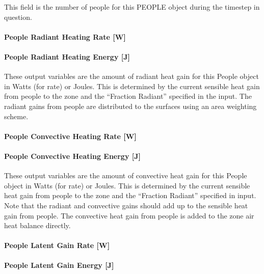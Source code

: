 This field is the number of people for this PEOPLE object during the timestep in question.

\paragraph{People Radiant Heating Rate {[}W{]}}\label{people-radiant-heating-rate-w}

\paragraph{People Radiant Heating Energy {[}J{]}}\label{people-radiant-heating-energy-j}

These output variables are the amount of radiant heat gain for this People object in Watts (for rate) or Joules. This is determined by the current sensible heat gain from people to the zone and the ``Fraction Radiant'' specified in the input. The radiant gains from people are distributed to the surfaces using an area weighting scheme.

\paragraph{People Convective Heating Rate {[}W{]}}\label{people-convective-heating-rate-w}

\paragraph{People Convective Heating Energy {[}J{]}}\label{people-convective-heating-energy-j}

These output variables are the amount of convective heat gain for this People object in Watts (for rate) or Joules. This is determined by the current sensible heat gain from people to the zone and the ``Fraction Radiant'' specified in input. Note that the radiant and convective gains should add up to the sensible heat gain from people. The convective heat gain from people is added to the zone air heat balance directly.

\paragraph{People Latent Gain Rate {[}W{]}}\label{people-latent-gain-rate-w}

\paragraph{People Latent Gain Energy {[}J{]}}\label{people-latent-gain-energy-j}

